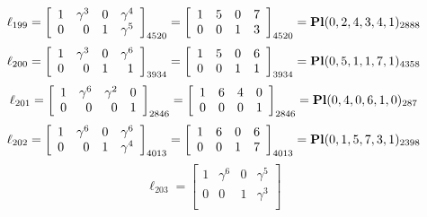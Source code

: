 \documentclass{article}
\begin{document}
{$$
\ell_{199} = 
\left[
\begin{array}{*{4}{r}}
1 & \gamma^{3} & 0 & \gamma^{4}\\
0 & 0 & 1 & \gamma^{5}\\
\end{array}
\right]
_{4520}
=
\left[
\begin{array}{*{4}c}
1  & 5  & 0  & 7\\
0  & 0  & 1  & 3\\
\end{array}
\right]_{4520}
={\rm\bf Pl}(0,2,4,3,4,1 )_{2888}$$
$$
\ell_{200} = 
\left[
\begin{array}{*{4}{r}}
1 & \gamma^{3} & 0 & \gamma^{6}\\
0 & 0 & 1 & 1\\
\end{array}
\right]
_{3934}
=
\left[
\begin{array}{*{4}c}
1  & 5  & 0  & 6\\
0  & 0  & 1  & 1\\
\end{array}
\right]_{3934}
={\rm\bf Pl}(0,5,1,1,7,1 )_{4358}$$
$$
\ell_{201} = 
\left[
\begin{array}{*{4}{r}}
1 & \gamma^{6} & \gamma^{2} & 0\\
0 & 0 & 0 & 1\\
\end{array}
\right]
_{2846}
=
\left[
\begin{array}{*{4}c}
1  & 6  & 4  & 0\\
0  & 0  & 0  & 1\\
\end{array}
\right]_{2846}
={\rm\bf Pl}(0,4,0,6,1,0 )_{287}$$
$$
\ell_{202} = 
\left[
\begin{array}{*{4}{r}}
1 & \gamma^{6} & 0 & \gamma^{6}\\
0 & 0 & 1 & \gamma^{4}\\
\end{array}
\right]
_{4013}
=
\left[
\begin{array}{*{4}c}
1  & 6  & 0  & 6\\
0  & 0  & 1  & 7\\
\end{array}
\right]_{4013}
={\rm\bf Pl}(0,1,5,7,3,1 )_{2398}$$
$$
\ell_{203} = 
\left[
\begin{array}{*{4}{r}}
1 & \gamma^{6} & 0 & \gamma^{5}\\
0 & 0 & 1 & \gamma^{3}\\
\end{array}
\right]
$$}
\end{document}

